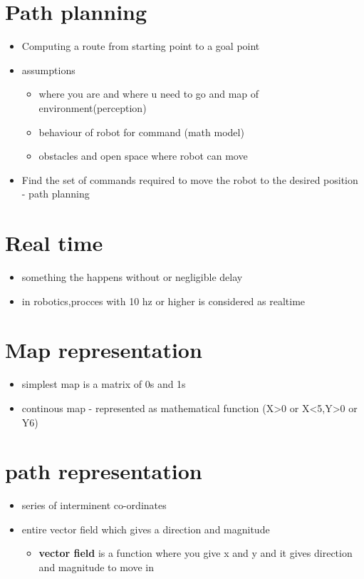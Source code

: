 \documentclass[a4paper]{article}
\begin{document}
   \section{Path planning} 
   \begin{itemize}
       \item Computing a route from starting point to a goal point
       \item assumptions
           \begin{itemize}
               \item where you are and where u need to go and map of environment(perception)
               \item behaviour of robot for command (math model)
               \item obstacles and open space where robot can move
           \end{itemize}
       \item Find the set of commands required to move the robot to the desired position - path planning
   \end{itemize}
   \section{Real time}
   \begin{itemize}
       \item something the happens without or negligible delay
       \item in robotics,procces with 10 hz or higher is considered as realtime
   \end{itemize}
   \section{Map representation}
   \begin{itemize}
       \item simplest map is a matrix of 0s and 1s
       \item continous map - represented as mathematical function (X>0 or X<5,Y>0 or Y6)
   \end{itemize}
   \section{path representation}
   \begin{itemize}
       \item series of interminent co-ordinates
       \item entire vector field which gives a direction and magnitude 
           \begin{itemize}
               \item \textbf{vector field} is a function where you give x and y and it gives direction and magnitude to move in
           \end{itemize}
   \end{itemize}
\end{document}
